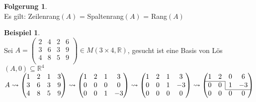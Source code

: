 \documentclass[10pt,a4paper,numbers=endperiod]{scrartcl}
\theoremstyle{definition}
\newtheorem{bsp}[satz]{Beispiel}
\newtheorem{folg}[satz]{Folgerung}
\def\RR{{\mathbb R}}
\begin{document}
\begin{folg}
	$ $\\
	Es gilt: Zeilenrang$(A)$ = Spaltenrang$(A)$ = Rang$(A)$
\end{folg}
\newpage
\begin{bsp}
	$ $\\
	Sei $A = 
	\begin{pmatrix}
		2&4&2&6\\
		3&6&3&9\\
		4&8&5&9\\
	\end{pmatrix}
	\in M(3 \times 4, \RR)$, gesucht ist eine Basis von Lös$(A,0) \subseteq \RR^4$\\
	
	$A \leadsto
	\begin{pmatrix}
	1&2&1&3\\
	3&6&3&9\\
	4&8&5&9\\
	\end{pmatrix} 
	\leadsto
	\begin{pmatrix}
	1&2&1&3\\
	0&0&0&0\\
	0&0&1&-3\\
	\end{pmatrix}
	\leadsto
	\begin{pmatrix}
	1&2&1&3\\
	0&0&1&-3\\
	0&0&0&0\\
	\end{pmatrix}
	\leadsto
		\begin{pmatrix}
	1&2&0&6\\
	\cline{1-2}
	0&0&\multicolumn{1}{|c}{1}&-3\\
	\cline{3-4}
	0&0&0&0\\
	\end{pmatrix}$\\
	

\end{bsp}
\end{document}
